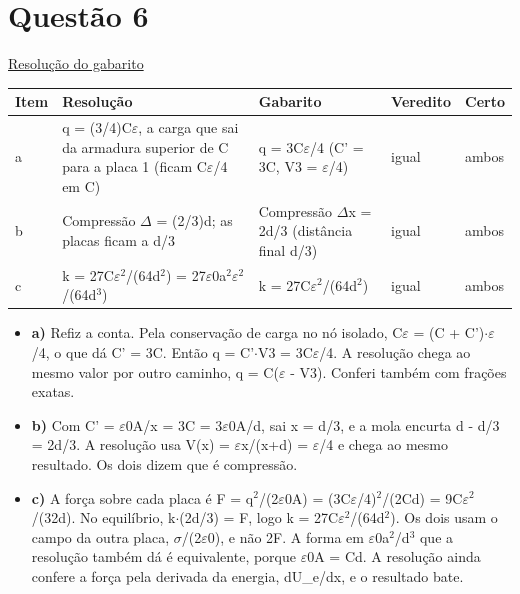 \documentclass{article}%
\begin{document}
\section*{Questão 6}%
\href{https://poliedroresolve.sistemapoliedro.com.br/vestibulares/ita/2027/ita-2-fase-dia-3-22-10-2026-2-fase-dia-3/dissertativa-6-fisica-2-fase-dia-3-ita-2027}{Resolução do gabarito}\par\smallskip%
\begin{longtable}{@{}p{} p{} p{} p{} p{}@{}}\toprule Item & Resolução & Gabarito & Veredito & Certo \\ \midrule
a & q = (3/4)C$\varepsilon$, a carga que sai da armadura superior de C para a placa 1 (ficam C$\varepsilon$/4 em C) & q = 3C$\varepsilon$/4 (C' = 3C, V3 = $\varepsilon$/4) & igual & ambos \\
b & Compressão $\Delta$ = (2/3)d; as placas ficam a d/3 & Compressão $\Delta$x = 2d/3 (distância final d/3) & igual & ambos \\
c & k = 27C$\varepsilon$$^2$/(64d$^2$) = 27$\varepsilon$0a$^2$$\varepsilon$$^2$/(64d$^3$) & k = 27C$\varepsilon$$^2$/(64d$^2$) & igual & ambos \\
\bottomrule\end{longtable}%
\begin{itemize}%
\item%
\textbf{a)} Refiz a conta. Pela conservação de carga no nó isolado, C$\varepsilon$ = (C + C')$\cdot$$\varepsilon$/4, o que dá C' = 3C. Então q = C'$\cdot$V3 = 3C$\varepsilon$/4. A resolução chega ao mesmo valor por outro caminho, q = C($\varepsilon$ - V3). Conferi também com frações exatas.%
\item%
\textbf{b)} Com C' = $\varepsilon$0A/x = 3C = 3$\varepsilon$0A/d, sai x = d/3, e a mola encurta d - d/3 = 2d/3. A resolução usa V(x) = $\varepsilon$x/(x+d) = $\varepsilon$/4 e chega ao mesmo resultado. Os dois dizem que é compressão.%
\item%
\textbf{c)} A força sobre cada placa é F = q$^2$/(2$\varepsilon$0A) = (3C$\varepsilon$/4)$^2$/(2Cd) = 9C$\varepsilon$$^2$/(32d). No equilíbrio, k$\cdot$(2d/3) = F, logo k = 27C$\varepsilon$$^2$/(64d$^2$). Os dois usam o campo da outra placa, $\sigma$/(2$\varepsilon$0), e não 2F. A forma em $\varepsilon$0a$^2$/d$^3$ que a resolução também dá é equivalente, porque $\varepsilon$0A = Cd. A resolução ainda confere a força pela derivada da energia, dU\_e/dx, e o resultado bate.%
\end{itemize}%
\end{document}
